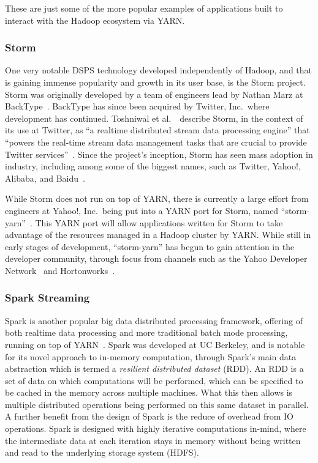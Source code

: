 \documentclass[a4paper,11pt]{article}
\begin{document}
These are just some of the more popular examples of applications built to interact with the Hadoop ecosystem via YARN.



\subsubsection{Storm} %
\label{ssub:storm}

One very notable DSPS technology developed independently of Hadoop, and that is gaining immense popularity and growth in its
user base, is the Storm project. Storm was originally developed by a team of engineers lead by Nathan Marz at
BackType~\cite{web_storm}. BackType has since been acquired by Twitter, Inc.\ where development has
continued. Toshniwal et al.~\cite{toshniwal2014storm}\ describe Storm, in the context of its use at Twitter, as ``a
realtime distributed stream data processing engine'' that ``powers the real-time stream data management tasks that are
crucial to provide Twitter services''~\cite[p.\ 147]{toshniwal2014storm}. Since the project's inception, Storm has seen mass
adoption in industry, including among some of the biggest names, such as Twitter, Yahoo!, Alibaba, and
Baidu~\cite{storm_users}.

While Storm does not run on top of YARN, there is currently a large effort from engineers at Yahoo!, Inc.\ being put
into a YARN port for Storm, named ``storm-yarn''~\cite{web_storm_yarn}. This YARN port will
allow applications written for Storm to take advantage of the resources managed in a Hadoop cluster by YARN. While still
in early stages of development, ``storm-yarn'' has begun to gain attention in the developer community, through focus from
channels such as the Yahoo Developer Network~\cite{web_yahoo_blog} and Hortonworks~\cite{web_hortonworks_blog}.



\subsubsection{Spark Streaming} %
\label{ssub:spark_streaming}

Spark is another popular big data distributed processing framework, offering of both realtime data processing
and more traditional batch mode processing, running on top of YARN~\cite{zaharia2010spark}. Spark was developed at UC
Berkeley, and is notable for its novel approach to in-memory computation, through Spark's main data abstraction which is
termed a \emph{resilient distributed dataset} (RDD). An RDD is a set of data on which computations will be performed,
which can be specified to be cached in the memory across multiple machines. What this then allows is multiple distributed
operations being performed on this same dataset in parallel. A further benefit from the design of Spark is the reduce of
overhead from IO operations. Spark is designed with highly iterative computations in-mind, where the intermediate data
at each iteration stays in memory without being written and read to the underlying storage system (\eg{}HDFS).
\end{document}
